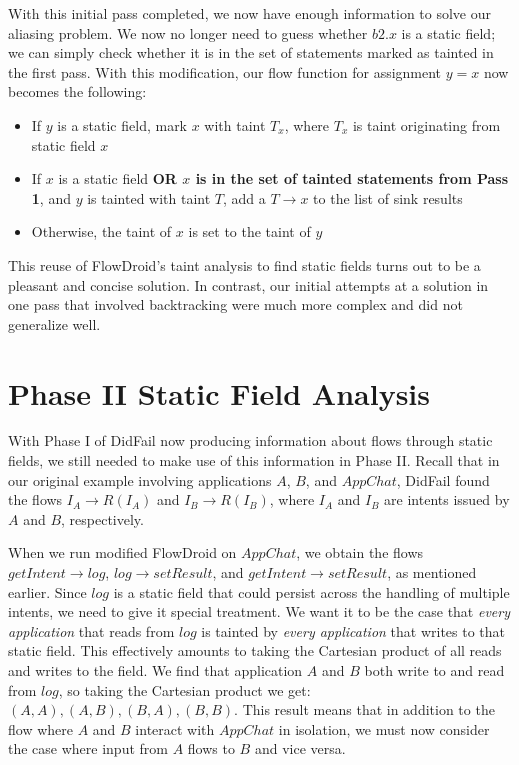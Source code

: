 With this initial pass completed, we now have enough information to solve our aliasing problem. We now no longer need to guess whether $\mathit{b2}.x$ is a static field; we can simply check whether it is in the set of statements marked as tainted in the first pass. With this modification, our flow function for assignment $y = x$ now becomes the following:

\begin{itemize}
\item If $y$ is a static field, mark $x$ with taint $T_x$, where $T_x$ is taint originating from static field $x$
\item If $x$ is a static field \textbf{OR $x$ is in the set of tainted statements from Pass 1}, and $y$ is tainted with taint $T$, add a $T\rightarrow x$ to the list of sink results
\item Otherwise, the taint of $x$ is set to the taint of $y$
\end{itemize}

This reuse of FlowDroid's taint analysis to find static fields turns out to be a pleasant and concise solution. In contrast, our initial attempts at a solution in one pass that involved backtracking were much more complex and did not generalize well.

\section{Phase II Static Field Analysis}
\label{sec:staticphase2}

With Phase I of DidFail now producing information about flows through static fields, we still needed to make use of this information in Phase II. Recall that in our original example involving applications $A$, $B$, and $AppChat$, DidFail found the flows $I_A\rightarrow R(I_A)$ and $I_B\rightarrow R(I_B)$, where $I_A$ and $I_B$ are intents issued by $A$ and $B$, respectively. 

When we run modified FlowDroid on $AppChat$, we obtain the flows $getIntent\rightarrow log$, $log\rightarrow setResult$, and $getIntent\rightarrow setResult$, as mentioned earlier. Since $log$ is a static field that could persist across the handling of multiple intents, we need to give it special treatment. We want it to be the case that \emph{every application} that reads from $log$ is tainted by \emph{every application} that writes to that static field. This effectively amounts to taking the Cartesian product of all reads and writes to the field. We find that application $A$ and $B$ both write to and read from $log$, so taking the Cartesian product we get: $(A, A), (A, B), (B, A), (B, B)$. This result means that in addition to the flow where $A$ and $B$ interact with $AppChat$ in isolation, we must now consider the case where input from $A$ flows to $B$ and vice versa.

